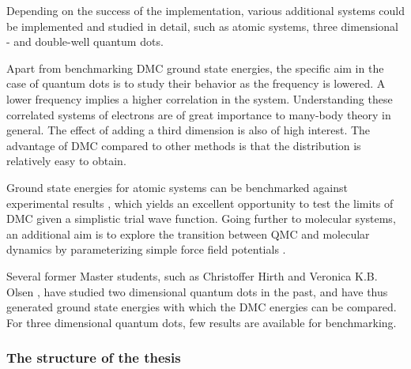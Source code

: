Depending on the success of the implementation, various additional systems could be implemented and studied in detail, such as atomic systems, three dimensional - and double-well quantum dots. 

Apart from benchmarking DMC ground state energies, the specific aim in the case of quantum dots is to study their behavior as the frequency is lowered. A lower frequency implies a higher correlation in the system. Understanding these correlated systems of electrons are of great importance to many-body theory in general. The effect of adding a third dimension is also of high interest. The advantage of DMC compared to other methods is that the distribution is relatively easy to obtain.

Ground state energies for atomic systems can be benchmarked against experimental results \cite{H_He_exact, ExactMolecules, AtomsExact, KryptonExact}, which yields an excellent opportunity to test the limits of DMC given a simplistic trial wave function. Going further to molecular systems, an additional aim is to explore the transition between QMC and molecular dynamics by parameterizing simple force field potentials \cite{forcesQMC}.

Several former Master students, such as Christoffer Hirth \cite{Hirth} and Veronica K.B. Olsen \cite{Olsen}, have studied two dimensional quantum dots in the past, and have thus generated ground state energies with which the DMC energies can be compared. For three dimensional quantum dots, few results are available for benchmarking.

\subsubsection{The structure of the thesis}

